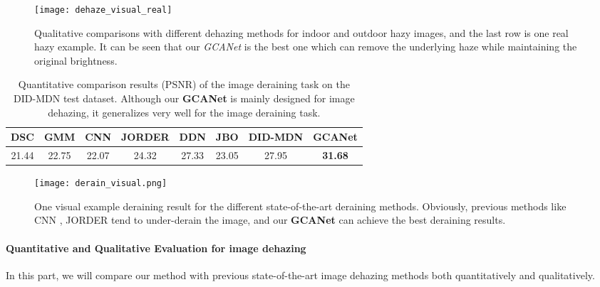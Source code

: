 \documentclass[10pt,twocolumn,letterpaper]{article}
\begin{document}
\begin{figure*}[t]
\begin{center}

\texttt{[image: dehaze\_visual\_real]}
\end{center}
\caption{Qualitative comparisons with different dehazing methods for indoor and outdoor hazy images, and the last row is one real hazy example. It can be seen that our \emph{GCANet} is the best one which can remove the underlying haze while maintaining the original brightness.}
\label{fg:dehaze}
\end{figure*}

\begin{table*}[ht]
\begin{center}
\begin{tabular}{cccccccc}
\hline
 DSC\cite{luo2015removing} & GMM \cite{li2016rain} & CNN\cite{fu2017clearing} & JORDER\cite{yang2017deep} & DDN \cite{fu2017removing}& JBO \cite{zhu2017joint} & DID-MDN\cite{zhang2018density} & \textbf{GCANet} \\
\hline
 21.44 & 22.75 & 22.07 & 24.32 & 27.33 & 23.05  & 27.95 & \textbf{31.68}\\
\hline
\end{tabular}
\vspace{1em}
\caption{Quantitative comparison results (PSNR) of the image deraining task on the DID-MDN test dataset. Although our \textbf{GCANet} is mainly designed for image dehazing, it generalizes very well for the image deraining task. }
\label{table:derain}
\end{center}
\end{table*}

\begin{figure*}[ht]
\begin{center}

\texttt{[image: derain\_visual.png]}
\end{center}
\caption{One visual example deraining result for the different state-of-the-art deraining methods. Obviously, previous methods like CNN \cite{fu2017clearing}, JORDER \cite{yang2017deep} tend to under-derain the image, and our \textbf{GCANet} can achieve the best deraining results.}
\label{fg:derain}
\end{figure*}

\paragraph{Quantitative and Qualitative Evaluation for image dehazing} In this part, we will compare our method with previous state-of-the-art image dehazing methods both quantitatively and qualitatively. 
\end{document}
